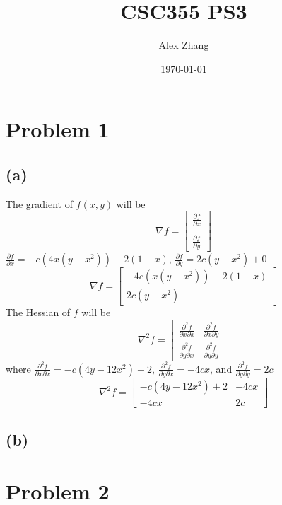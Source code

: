 \documentclass{article}
\title{CSC355 PS3}
\author{Alex Zhang}
\date{\today}
\newcommand{\bmat}[1]{\begin{bmatrix} #1 \end{bmatrix}}
\begin{document}
\maketitle
\section*{Problem 1}
\subsection*{(a)}
The gradient of $f(x,y)$ will be
$$\nabla f = \bmat{\frac{\partial f}{\partial x} \\ \\
\frac{\partial f}{\partial y}} $$
$\frac{\partial f}{\partial x} = -c(4x(y-x^2)) - 2(1-x)$, $\frac{\partial f}{\partial y} = 2c(y-x^2) + 0$
$$\nabla f = \bmat{-4c(x(y-x^2)) - 2(1-x) \\ 2c(y-x^2)}$$
The Hessian of $f$ will be
$$\nabla^2 f = \bmat{\frac{\partial^2 f}{\partial x \partial x} &  \frac{\partial^2 f}{\partial x \partial y}\\
                    \frac{\partial^2 f}{\partial y \partial x} &  \frac{\partial^2 f}{\partial y \partial y} }$$
where $\frac{\partial^2 f}{\partial x \partial x} = -c(4y - 12x^2) + 2$, $\frac{\partial^2 f}{\partial y \partial x} = -4cx$, and $\frac{\partial^2 f}{\partial y \partial y} = 2c$
$$\nabla^2 f =  \bmat{-c(4y - 12x^2) + 2 & -4cx \\ -4cx &2c }$$
\subsection*{(b)}

\section*{Problem 2}
\end{document}
